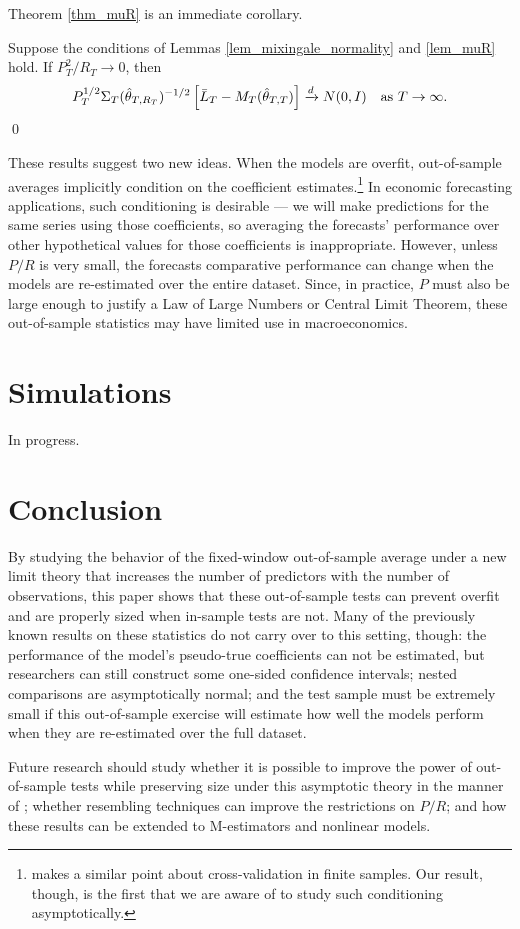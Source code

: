\documentclass[11pt]{article} \def\baselinestretch{1.08}
\begin{document}
Theorem \ref{thm_muR} is an immediate corollary.
\begin{thm} \label{thm_muR}
  Suppose the conditions of Lemmas \ref{lem_mixingale_normality}
  and \ref{lem_muR} hold.  If $P_T^2/R_T \to 0$, then
  \[
  P_T^{1/2} \Sigma_T({\hat \theta_{{}T,{R_T}}})^{-1/2} \left[\bar L_{{}T} - M_{{}T}({\hat \theta_{{}T,{T}}})\right] \xrightarrow{d}
  N(0, I) \quad \text{as $T \to \infty$.}
  \]
  \qed
\end{thm}

These results suggest two new ideas.  When the
models are overfit, out-of-sample averages implicitly condition on the
coefficient estimates.\footnote{ makes a
similar point about cross-validation in finite samples.  Our result,
though, is the first that we are aware of to study such conditioning
asymptotically.}  In economic forecasting applications, such
conditioning is desirable --- we will make predictions for the same
series using those coefficients, so averaging the forecasts'
performance over other hypothetical values for those coefficients is
inappropriate.  However, unless $P/R$ is very small, the forecasts
comparative performance can change when the models are re-estimated
over the entire dataset.  Since, in practice, $P$ must also be large
enough to justify a Law of Large Numbers or Central Limit Theorem,
these out-of-sample statistics may have limited use in macroeconomics.
\section{Simulations} \label{sec_mc}
In progress.
\section{Conclusion} 
By studying the behavior of the fixed-window out-of-sample average
under a new limit theory that increases the number of predictors with
the number of observations, this paper shows that these out-of-sample
tests can prevent overfit and are properly sized when in-sample tests
are not.  Many of the previously known  results on these statistics do not
carry over to this setting, though: the performance of the model's
pseudo-true coefficients can not be estimated, but researchers can
still construct some one-sided confidence intervals; nested
comparisons are asymptotically normal; and the test sample must be
extremely small if this out-of-sample exercise will estimate how
well the models perform when they are re-estimated over the
full dataset.

Future research should study whether it is possible to improve the
power of out-of-sample tests while preserving size under this
asymptotic theory in the manner of
; whether
resembling techniques can improve the restrictions on $P/R$; and how
these results can be extended to M-estimators and nonlinear models.
\appendix
\end{document}
